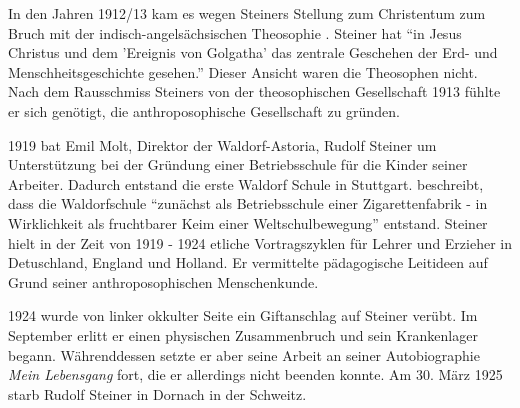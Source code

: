 

In den Jahren 1912/13 kam es wegen Steiners Stellung zum Christentum zum Bruch mit der indisch-angelsächsischen Theosophie \citep[Vgl.][S. 80]{hemleben63}. Steiner hat \enquote{in Jesus Christus und dem 'Ereignis von Golgatha' das zentrale Geschehen der Erd- und Menschheitsgeschichte gesehen.}  Dieser Ansicht waren die Theosophen nicht. Nach dem Rausschmiss Steiners von der theosophischen Gesellschaft 1913 fühlte er sich genötigt, die anthroposophische Gesellschaft zu gründen.

1919 bat Emil Molt, Direktor der Waldorf-Astoria, Rudolf Steiner um Unterstützung bei der Gründung einer Betriebsschule für die Kinder seiner Arbeiter. Dadurch entstand die erste Waldorf Schule in Stuttgart. \citet[S. 124]{hemleben63} beschreibt, dass die Waldorfschule \enquote{zunächst als Betriebsschule einer Zigarettenfabrik - in Wirklichkeit als fruchtbarer Keim einer Weltschulbewegung} entstand. Steiner hielt in der Zeit von 1919 - 1924 etliche Vortragszyklen für Lehrer und Erzieher in Detuschland, England und Holland. Er vermittelte pädagogische Leitideen auf Grund seiner anthroposophischen Menschenkunde. 

1924 wurde von linker okkulter Seite ein Giftanschlag auf Steiner verübt. Im September erlitt er einen physischen Zusammenbruch und sein Krankenlager begann. Währenddessen setzte er aber seine Arbeit an seiner Autobiographie \emph{Mein Lebensgang} fort, die er allerdings nicht beenden konnte. Am 30. März 1925 starb Rudolf Steiner in Dornach in der Schweitz. \citep[Vgl.][]{karl12}



















